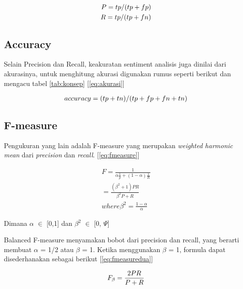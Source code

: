 \begin{equation}
\begin{split}
\tiny
P = tp/(tp+fp) \\ 
R = tp/(tp+fn)
\label{eq:evaluasi}
\normalsize
\end{split}
\end{equation}

\subsection*{Accuracy}
Selain Precision dan Recall, keakuratan sentiment analisis juga dinilai dari akurasinya, untuk menghitung akurasi digunakan rumus seperti berikut dan mengacu tabel \ref{tab:konsep} [\ref{eq:akurasi}]

\begin{equation}
\begin{split}
\tiny
accuracy = (tp+tn)/(tp+fp+fn+tn)
\label{eq:akurasi}
\normalsize
\end{split}
\end{equation}

\subsection*{F-measure}
Pengukuran yang lain adalah F-measure yang merupakan \textit{weighted harmonic mean} dari \textit{precision} dan \textit{recall}. [\ref{eq:fmeasure}]

\begin{equation}
\begin{split}
F = \frac{1}{\alpha \frac{1}{p} + (1 - \alpha)\frac{1}{R}} \\
= \frac{(\beta^2 + 1)PR}{\beta^2P + R} \\
where \beta^2 = \frac{1 - \alpha}{\alpha}
\label{eq:fmeasure}
\end{split}
\end{equation}

Dimana $\alpha$ $\in$ [0,1] dan $\beta^2$ $\in$ [0, $\Psi$]

Balanced F-measure menyamakan bobot dari precision dan recall, yang berarti membuat $\alpha$ = 1/2 atau $\beta$ = 1. Ketika menggunakan $\beta$ = 1, formula dapat disederhanakan sebagai berikut  [\ref{eq:fmeasuredua}]

\begin{equation}
\begin{split}
\tiny
F_\beta = \frac{2PR}{P + R}
\label{eq:fmeasuredua}
\normalsize
\end{split}
\end{equation}
